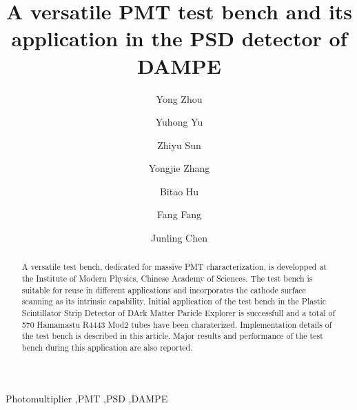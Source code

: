 \documentclass[review,number,sort&compress]{elsarticle}
\begin{document}
\begin{frontmatter}

\title{A versatile PMT test bench and its application in the PSD detector of DAMPE}

\author[imp,lzu,ucas]{Yong Zhou}

\author[imp]{Yuhong Yu}

\author[imp]{Zhiyu Sun}

\author[imp]{Yongjie Zhang}
\author[lzu]{Bitao Hu}
\author[imp]{Fang Fang}
\author[imp]{Junling Chen}

\address[imp]{Institute of Modern Physicas, Chinese Academy of Sciences,  509 Nanchang Road,  Lanzhou,  730000,  P.R.China}
\address[lzu]{School of Nuclear Science and Technology,  Lanzhou University,  222 South Tianshui Road,  Lanzhou,  730000,  P.R.China}
\address[ucas]{Graduate University of the Chinese Academy of Sciences,  19A Yuquan Road,  Beijing,  100049,  P.R.China}

\begin{abstract}

A versatile test bench, dedicated for massive PMT characterization, is developped at the Institute of Modern Physics, Chinese Academy of Sciences.
The test bench is suitable for reuse in different applications and incorporates the cathode surface scanning as its intrinsic capability.
Initial application of the test bench in the Plastic Scintillator Strip Detector of DArk Matter Paricle Explorer is successfull and a total of 570 Hamamastu R4443 Mod2 tubes have been charaterized.
Implementation details of the test bench is described in this article.
Major results and performance of the test bench during this application are also reported. 
\end{abstract}

\begin{keyword}
Photomultiplier
\sep PMT
\sep PSD
\sep DAMPE



\end{keyword}

\end{frontmatter}
\end{document}
